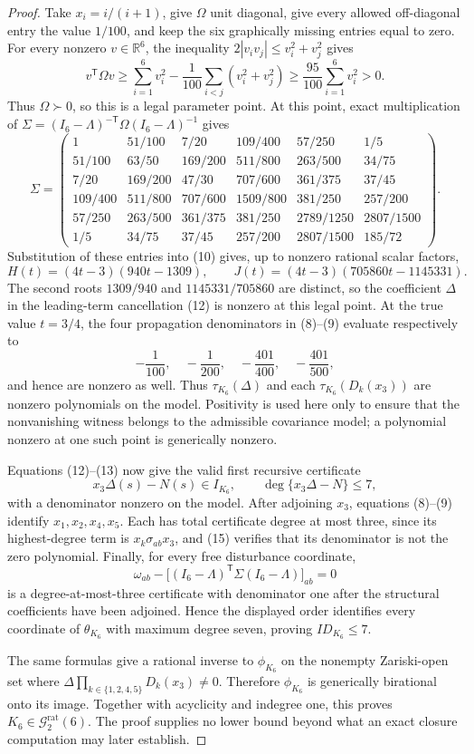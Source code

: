 \documentclass{article}
\begin{document}
\begin{proof}
Take \(x_i=i/(i+1)\), give \(\Omega\) unit diagonal, give every allowed off-diagonal entry the value \(1/100\), and keep the six graphically missing entries equal to zero.  For every nonzero \(v\in\mathbb R^6\), the inequality \(2|v_iv_j|\leq v_i^2+v_j^2\) gives
\[
 v^{\mathsf T}\Omega v
 \geq \sum_{i=1}^6v_i^2-
 \frac1{100}\sum_{i<j}(v_i^2+v_j^2)
 \geq\frac{95}{100}\sum_{i=1}^6v_i^2>0.
\]
Thus \(\Omega\succ0\), so this is a legal parameter point.  At this point, exact multiplication of \(\Sigma=(I_6-\Lambda)^{-\mathsf T}\Omega(I_6-\Lambda)^{-1}\) gives
\[
 \Sigma=\begin{pmatrix}
 1&51/100&7/20&109/400&57/250&1/5\\
 51/100&63/50&169/200&511/800&263/500&34/75\\
 7/20&169/200&47/30&707/600&361/375&37/45\\
 109/400&511/800&707/600&1509/800&381/250&257/200\\
 57/250&263/500&361/375&381/250&2789/1250&2807/1500\\
 1/5&34/75&37/45&257/200&2807/1500&185/72
 \end{pmatrix}.
\]
Substitution of these entries into (10) gives, up to nonzero rational scalar factors,
\[
 H(t)=(4t-3)(940t-1309),\qquad
 J(t)=(4t-3)(705860t-1145331). \tag{14}
\]
The second roots \(1309/940\) and \(1145331/705860\) are distinct, so the coefficient \(\Delta\) in the leading-term cancellation (12) is nonzero at this legal point.  At the true value \(t=3/4\), the four propagation denominators in (8)--(9) evaluate respectively to
\[
 -\frac1{100},\quad-\frac1{200},\quad-\frac{401}{400},\quad-\frac{401}{500}, \tag{15}
\]
and hence are nonzero as well.  Thus \(\tau_{K_6}(\Delta)\) and each \(\tau_{K_6}(D_k(x_3))\) are nonzero polynomials on the model.  Positivity is used here only to ensure that the nonvanishing witness belongs to the admissible covariance model; a polynomial nonzero at one such point is generically nonzero.

Equations (12)--(13) now give the valid first recursive certificate
\[
 x_3\Delta(s)-N(s)\in I_{K_6},\qquad
 \deg\{x_3\Delta-N\}\leq7, \tag{16}
\]
with a denominator nonzero on the model.  After adjoining \(x_3\), equations (8)--(9) identify \(x_1,x_2,x_4,x_5\).  Each has total certificate degree at most three, since its highest-degree term is \(x_k\sigma_{ab}x_3\), and (15) verifies that its denominator is not the zero polynomial.  Finally, for every free disturbance coordinate,
\[
 \omega_{ab}-\bigl[(I_6-\Lambda)^{\mathsf T}\Sigma(I_6-\Lambda)\bigr]_{ab}=0 \tag{17}
\]
is a degree-at-most-three certificate with denominator one after the structural coefficients have been adjoined.  Hence the displayed order identifies every coordinate of \(\theta_{K_6}\) with maximum degree seven, proving \(ID_{K_6}\leq7\).

The same formulas give a rational inverse to \(\phi_{K_6}\) on the nonempty Zariski-open set where \(\Delta\prod_{k\in\{1,2,4,5\}}D_k(x_3)\neq0\).  Therefore \(\phi_{K_6}\) is generically birational onto its image.  Together with acyclicity and indegree one, this proves \(K_6\in\mathcal G_{2}^{\mathrm{rat}}(6)\).  The proof supplies no lower bound beyond what an exact closure computation may later establish.
\end{proof}
\end{document}
